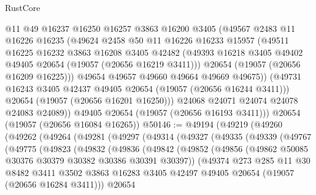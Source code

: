 \begin{lexlean}{RustCore}
\begin{coremodule}
            @11
            @49
            @16237
            @16250
            @16257
            @3863
            @16200
            @3405
            (@49567
              @2483
              @11
              @16226
              @16235
              (@49624
                @2458
                @50
                @11
                @16226
                @16233
                @15957
                (@49511
                  @16225
                  @16232
                  @3863
                  @16208
                  @3405
                  @42482
                  (@49393 @16218 @3405 @49402 @49405 @20654 (@19057 (@20656 @16219 @3411)))
                  @20654
                  (@19057 (@20656 @16209 @16225)))
                @49654
                @49657
                @49660
                @49664
                @49669
                @49675))
            (@49731 @16243 @3405 @42437 @49405 @20654 (@19057 (@20656 @16244 @3411)))
            @20654
            (@19057 (@20656 @16201 @16250)))
          @24068
          @24071
          @24074
          @24078
          @24083
          @24089))
      @49405
      @20654
      (@19057 (@20656 @16193 @3411)))
    @20654
    (@19057 (@20656 @16084 @16265))
@50146 := @49194
    (@49219
      (@49260
        (@49262
          (@49264
            (@49281
              (@49297
                (@49314
                  (@49327
                    (@49335
                      (@49339
                        (@49767
                          (@49775
                            (@49823
                              (@49832
                                (@49836
                                  (@49842
                                    (@49852
                                      (@49856
                                        (@49862 @50085 @30376 @30379 @30382 @30386 @30391 @30397))
                                      (@49374
                                        @273
                                        @285
                                        @11
                                        @30
                                        @8482
                                        @3411
                                        @3502
                                        @3863
                                        @16283
                                        @3405
                                        @42497
                                        @49405
                                        @20654
                                        (@19057 (@20656 @16284 @3411)))
                                      @20654

\end{coremodule}
\end{lexlean}
